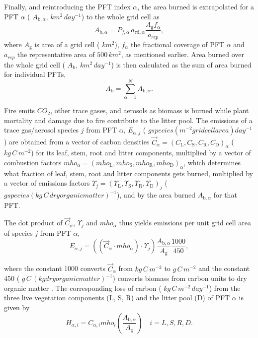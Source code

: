 Finally, and reintroducing the P\+F\+T index $\alpha$, the area burned is extrapolated for a P\+F\+T $\alpha$ ( $A_{\mathrm{b},\alpha}$, $km^2\, day^{-1}$) to the whole grid cell as \[A_{\mathrm{b},\alpha}=P_{f,\alpha}\,a_{\tau \mathrm{d},\alpha} \frac{A_\mathrm{g}f_\alpha}{a_{rep}}, \] where $A_\mathrm{g}$ is area of a grid cell ( $km^2$), $f_\alpha$ the fractional coverage of P\+F\+T $\alpha$ and $a_{rep}$ the representative area of $500\,km^2$, as mentioned earlier. Area burned over the whole grid cell ( $A_\mathrm{b}$, $km^2\,day^{-1}$) is then calculated as the sum of area burned for individual P\+F\+Ts, \[ A_\mathrm{b}=\sum_{\alpha=1}^{N}A_{\mathrm{b},\alpha}.\]

Fire emits $CO_2$, other trace gases, and aerosols as biomass is burned while plant mortality and damage due to fire contribute to the litter pool. The emissions of a trace gas/aerosol species $j$ from P\+F\+T $\alpha$, $E_{\alpha,j}$ ( $g species (m^{-2} grid cell area) day^{-1}$) are obtained from a vector of carbon densities $\vec{C}_{\alpha} = (C_\mathrm{L}, C_\mathrm{S}, C_\mathrm{R}, C_\mathrm{D})_\alpha$ ( $kg\,C\,m^{-2}$) for its leaf, stem, root and litter components, multiplied by a vector of combustion factors $mho_{\alpha} = (mho_\mathrm{L}, mho_\mathrm{S}, mho_\mathrm{R}, mho_\mathrm{D})_\alpha$, which determines what fraction of leaf, stem, root and litter components gets burned, multiplied by a vector of emissions factors $\Upsilon_{j} = (\Upsilon_\mathrm{L}, \Upsilon_\mathrm{S}, \Upsilon_\mathrm{R}, \Upsilon_\mathrm{D})_j$ ( $g species (kg\,C\,dry organic matter)^{-1}$), and by the area burned $A_{\mathrm{b},\alpha}$ for that P\+F\+T.

The dot product of $\vec{C}_{\alpha}$, $\Upsilon_{j}$ and $mho_{\alpha} $ thus yields emissions per unit grid cell area of species $j$ from P\+F\+T $\alpha$, \[ \label{emiss_combust_factor} {E_{\alpha,j}}= ((\vec{C}_\alpha\cdot mho_{\alpha} )\cdot \Upsilon_{j}) \frac{A_{\mathrm{b},\alpha}}{A_\mathrm{g}}\frac{1000}{450}, \]

where the constant 1000 converts $\vec{C}_\alpha$ from $kg\,C\,m^{-2}$ to $g\,C\,m^{-2}$ and the constant 450 ( $g\,C\,(kg dry organic matter)^{-1} $) converts biomass from carbon units to dry organic matter \cite{Li20121c2}. The corresponding loss of carbon ( $kg\,C\,m^{-2}\,day^{-1}$) from the three live vegetation components (L, S, R) and the litter pool (D) of P\+F\+T $\alpha$ is given by \[ \label{emiss_combust_loss} H_{\alpha, i}= C_{\alpha, i} mho_i\left(\frac{A_{\mathrm{b},\alpha}}{A_\mathrm{g}}\right)\quad i={L, S, R, D}. \]

